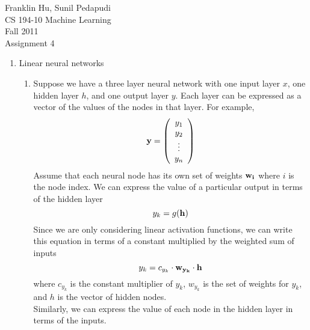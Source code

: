 \documentclass{article}
\begin{document}
Franklin Hu, Sunil Pedapudi \\
CS 194-10 Machine Learning \\
Fall 2011 \\
Assignment 4 \\

\begin{enumerate}
    \item Linear neural networks %
        \begin{enumerate}
            \item %
                Suppose we have a three layer neural network with one input
                layer \(x\), one hidden layer \(h\), and one output layer 
                \(y\). Each layer can be expressed as a vector of the 
                values of the nodes in that layer. For example,
                \begin{equation*}
                    \bf{y}= \left( \begin{array}{c}
                    y_1 \\
                    y_2 \\
                    \vdots \\
                    y_n \end{array} \right)
                \end{equation*}
                Assume that each neural node has its own set of weights 
                \(\bf{w_i}\) where \(i\) is the node index. We can express 
                the value of a particular output in terms of the hidden 
                layer
                \begin{equation*}
                    y_k= g(\bf{h})
                \end{equation*}
                Since we are only considering linear activation functions,
                we can write this equation in terms of a constant
                multiplied by the weighted sum of inputs
                \begin{equation*}
                    y_k= c_{y_k} \cdot \bf{w_{y_k}} \cdot \bf{h}
                \end{equation*}
                where \(c_{y_k}\) is the constant multiplier of \(y_k\),
                \(w_{y_k}\) is the set of weights for \(y_k\), and \(h\)
                is the vector of hidden nodes. \\
                Similarly, we can express the value of each node in the 
                hidden layer in terms of the inputs.
                \begin{equation*}

\end{equation*}
\end{enumerate}
\end{enumerate}
\end{document}
